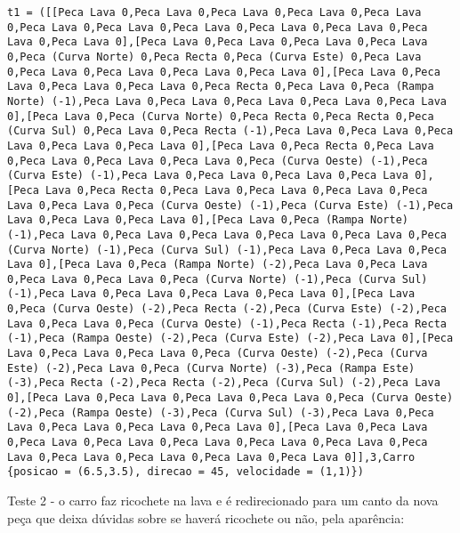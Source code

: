 \documentclass[a4paper]{report}
\begin{document}
\begin{lstlisting}
t1 = ([[Peca Lava 0,Peca Lava 0,Peca Lava 0,Peca Lava 0,Peca Lava 0,Peca Lava 0,Peca Lava 0,Peca Lava 0,Peca Lava 0,Peca Lava 0,Peca Lava 0,Peca Lava 0],[Peca Lava 0,Peca Lava 0,Peca Lava 0,Peca Lava 0,Peca (Curva Norte) 0,Peca Recta 0,Peca (Curva Este) 0,Peca Lava 0,Peca Lava 0,Peca Lava 0,Peca Lava 0,Peca Lava 0],[Peca Lava 0,Peca Lava 0,Peca Lava 0,Peca Lava 0,Peca Recta 0,Peca Lava 0,Peca (Rampa Norte) (-1),Peca Lava 0,Peca Lava 0,Peca Lava 0,Peca Lava 0,Peca Lava 0],[Peca Lava 0,Peca (Curva Norte) 0,Peca Recta 0,Peca Recta 0,Peca (Curva Sul) 0,Peca Lava 0,Peca Recta (-1),Peca Lava 0,Peca Lava 0,Peca Lava 0,Peca Lava 0,Peca Lava 0],[Peca Lava 0,Peca Recta 0,Peca Lava 0,Peca Lava 0,Peca Lava 0,Peca Lava 0,Peca (Curva Oeste) (-1),Peca (Curva Este) (-1),Peca Lava 0,Peca Lava 0,Peca Lava 0,Peca Lava 0],[Peca Lava 0,Peca Recta 0,Peca Lava 0,Peca Lava 0,Peca Lava 0,Peca Lava 0,Peca Lava 0,Peca (Curva Oeste) (-1),Peca (Curva Este) (-1),Peca Lava 0,Peca Lava 0,Peca Lava 0],[Peca Lava 0,Peca (Rampa Norte) (-1),Peca Lava 0,Peca Lava 0,Peca Lava 0,Peca Lava 0,Peca Lava 0,Peca (Curva Norte) (-1),Peca (Curva Sul) (-1),Peca Lava 0,Peca Lava 0,Peca Lava 0],[Peca Lava 0,Peca (Rampa Norte) (-2),Peca Lava 0,Peca Lava 0,Peca Lava 0,Peca Lava 0,Peca (Curva Norte) (-1),Peca (Curva Sul) (-1),Peca Lava 0,Peca Lava 0,Peca Lava 0,Peca Lava 0],[Peca Lava 0,Peca (Curva Oeste) (-2),Peca Recta (-2),Peca (Curva Este) (-2),Peca Lava 0,Peca Lava 0,Peca (Curva Oeste) (-1),Peca Recta (-1),Peca Recta (-1),Peca (Rampa Oeste) (-2),Peca (Curva Este) (-2),Peca Lava 0],[Peca Lava 0,Peca Lava 0,Peca Lava 0,Peca (Curva Oeste) (-2),Peca (Curva Este) (-2),Peca Lava 0,Peca (Curva Norte) (-3),Peca (Rampa Este) (-3),Peca Recta (-2),Peca Recta (-2),Peca (Curva Sul) (-2),Peca Lava 0],[Peca Lava 0,Peca Lava 0,Peca Lava 0,Peca Lava 0,Peca (Curva Oeste) (-2),Peca (Rampa Oeste) (-3),Peca (Curva Sul) (-3),Peca Lava 0,Peca Lava 0,Peca Lava 0,Peca Lava 0,Peca Lava 0],[Peca Lava 0,Peca Lava 0,Peca Lava 0,Peca Lava 0,Peca Lava 0,Peca Lava 0,Peca Lava 0,Peca Lava 0,Peca Lava 0,Peca Lava 0,Peca Lava 0,Peca Lava 0]],3,Carro {posicao = (6.5,3.5), direcao = 45, velocidade = (1,1)})
\end{lstlisting}

Teste 2 - o carro faz ricochete na lava e é redirecionado para um canto da nova peça que deixa dúvidas sobre se haverá ricochete ou não, pela aparência:
\end{document}
